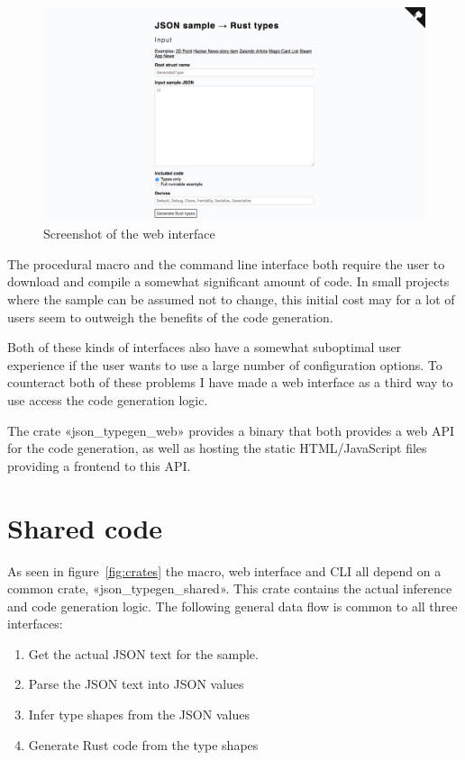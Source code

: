 \begin{figure}[ht!]
\includegraphics[width=\textwidth]{json_typegen_web}
\hspace*{-1.5in} %
\caption{Screenshot of the web interface}
\label{fig:web-screenshot}
\end{figure}

The procedural macro and the command line interface both require the user to download and compile a somewhat significant amount of code. In small projects where the sample can be assumed not to change, this initial cost may for a lot of users seem to outweigh the benefits of the code generation.

Both of these kinds of interfaces also have a somewhat suboptimal user experience if the user wants to use a large number of configuration options. To counteract both of these problems I have made a web interface as a third way to use access the code generation logic.

The crate «json_typegen_web» provides a binary that both provides a web API for the code generation, as well as hosting the static HTML/JavaScript files providing a frontend to this API.

\section{Shared code}

As seen in figure~\ref{fig:crates} the macro, web interface and CLI all depend on a common crate, «json_typegen_shared». This crate contains the actual inference and code generation logic. The following general data flow is common to all three interfaces:

\begin{enumerate}
  \item Get the actual JSON text for the sample.
  \item Parse the JSON text into JSON values
  \item Infer type shapes from the JSON values
  \item Generate Rust code from the type shapes
\end{enumerate}


